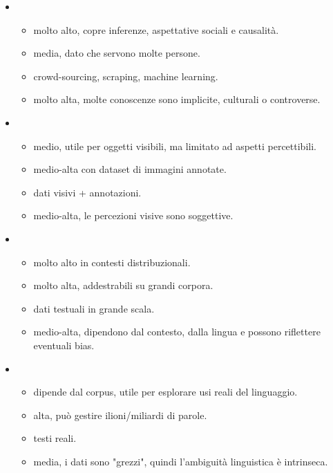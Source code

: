 \begin{itemize}
  \item {}
    \begin{itemize}
      \item {} molto alto, copre inferenze, aspettative sociali e causalità.
      \item {} media, dato che servono molte persone. 
      \item {} crowd-sourcing, scraping, machine learning.
      \item {} molto alta, molte conoscenze sono implicite, culturali o controverse.
    \end{itemize}
    \item {}
    \begin{itemize}
      \item {} medio, utile per oggetti visibili, ma limitato ad aspetti percettibili. 
      \item {}  medio-alta con dataset di immagini annotate.
      \item {} dati visivi + annotazioni.
      \item {} medio-alta, le percezioni visive sono soggettive.
    \end{itemize}
\item {}
    \begin{itemize}
      \item {} molto alto in contesti distribuzionali. 
      \item {} molto alta, addestrabili su grandi corpora.
      \item {} dati testuali in grande scala.
      \item {} medio-alta, dipendono dal contesto, dalla lingua e possono riflettere eventuali bias.
    \end{itemize}
\item {}
    \begin{itemize}
      \item {} dipende dal corpus, utile per esplorare usi reali del linguaggio. 
      \item {} alta, può gestire ilioni/miliardi di parole.
      \item {} testi reali.
      \item {} media, i dati sono "grezzi", quindi l'ambiguità linguistica è intrinseca.
    \end{itemize}

\end{itemize}

